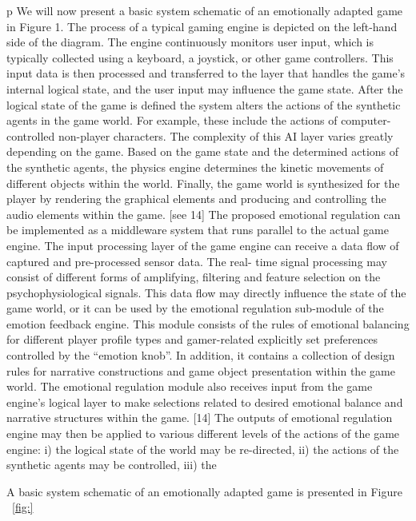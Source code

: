 p We will now present a basic system schematic of an emotionally adapted game in Figure 1. The process of a typical gaming engine is depicted on the left-hand side of the diagram. The engine continuously monitors user input, which is typically collected using a keyboard, a joystick, or other game controllers. This input data is then processed and transferred to the layer that handles the game’s internal logical state, and the user input may influence the game state. After the logical state of the game is defined the system alters the actions of the synthetic agents in the game world. For example, these include the actions of computer-controlled non-player characters. The complexity of this AI layer varies greatly depending on the game. Based on the game state and the determined actions of the synthetic agents, the physics engine determines the kinetic movements of different objects within  the world. Finally, the game world is synthesized for the player by rendering the graphical elements and producing and controlling the audio elements within the game. [see 14] The proposed emotional regulation can be implemented as a middleware system that runs parallel to the actual game engine. The input processing layer of the game engine can receive a data flow of captured and pre-processed sensor data. The real- time signal processing may consist of different forms of amplifying, filtering and feature selection on the psychophysiological signals. This data flow may directly influence the state of the game world, or it can be used by the emotional regulation sub-module of the emotion feedback engine. This module consists of the rules of emotional balancing for different player profile types and gamer-related explicitly set preferences controlled by the “emotion knob”. In addition, it contains a collection of design rules for narrative constructions and game object presentation within the game world. The emotional regulation module also receives input from the game engine’s logical layer to make selections related to desired emotional balance and narrative structures within the game. [14] The outputs of emotional regulation engine may then be applied to various different levels of the actions of the game engine: i) the logical state of the world may be re-directed, ii) the actions of the synthetic agents may be controlled, iii) the 

A basic system schematic of an emotionally adapted game is presented in Figure ~\ref{fig:}

